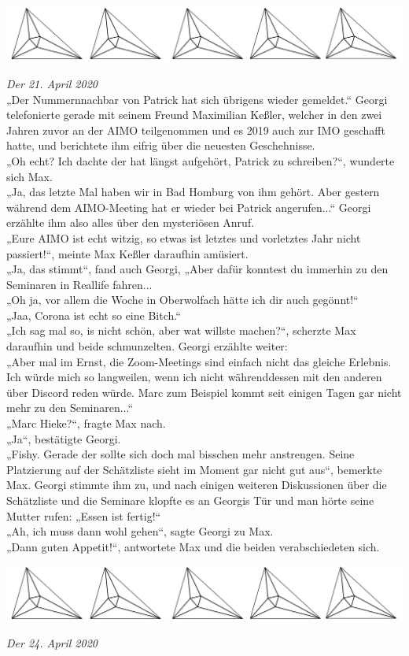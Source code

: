 \documentclass[oneside]{memoir}
\newcommand{\parasep}{
\bigskip
\bigskip
\begin{center} 
   \includegraphics[scale=.08]{parasep5.jpg} 
\end{center}
\bigskip
\bigskip
}
\begin{document}
\parasep

\textit{Der 21. April 2020} \\ 
„Der Nummernnachbar von Patrick hat sich übrigens wieder gemeldet.“ Georgi telefonierte gerade mit seinem Freund Maximilian Keßler, welcher in den zwei Jahren zuvor an der AIMO teilgenommen und es 2019 auch zur IMO geschafft hatte, und berichtete ihm eifrig über die neuesten Geschehnisse. \\
 „Oh echt? Ich dachte der hat längst aufgehört, Patrick zu schreiben?“, wunderte sich Max. \\
 „Ja, das letzte Mal haben wir in Bad Homburg von ihm gehört. Aber gestern während dem AIMO-Meeting hat er wieder bei Patrick angerufen...“ Georgi erzählte ihm also alles über den mysteriösen Anruf. \\
 „Eure AIMO ist echt witzig, so etwas ist letztes und vorletztes Jahr nicht passiert!“, meinte Max Keßler daraufhin amüsiert. \\
 „Ja, das stimmt“, fand auch Georgi, „Aber dafür konntest du immerhin zu den Seminaren in Reallife fahren... \\
  „Oh ja, vor allem die Woche in Oberwolfach hätte ich dir auch gegönnt!“ \\
   „Jaa, Corona ist echt so eine Bitch.“ \\
    „Ich sag mal so, is nicht schön, aber wat willste machen?“, scherzte Max daraufhin und beide schmunzelten. Georgi erzählte weiter: \\
    „Aber mal im Ernst, die Zoom-Meetings sind einfach nicht das gleiche Erlebnis. Ich würde mich so langweilen, wenn ich nicht währenddessen mit den anderen über Discord reden würde. Marc zum Beispiel kommt seit einigen Tagen gar nicht mehr zu den Seminaren...“ \\
    „Marc Hieke?“, fragte Max nach. \\
     „Ja“, bestätigte Georgi. \\
     „Fishy. Gerade der sollte sich doch mal bisschen mehr anstrengen. Seine Platzierung auf der Schätzliste sieht im Moment gar nicht gut aus“, bemerkte Max. Georgi stimmte ihm zu, und nach einigen weiteren Diskussionen über die Schätzliste und die Seminare klopfte es an Georgis Tür und man hörte seine Mutter rufen: „Essen ist fertig!“ \\
     „Ah, ich muss dann wohl gehen“, sagte Georgi zu Max. \\
     „Dann guten Appetit!“, antwortete Max und die beiden verabschiedeten sich.
     
     \parasep
     \textit{Der 24. April 2020} \\ 
     
\end{document}
